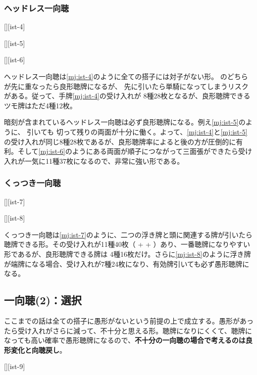 \documentclass[10pt, twocolumn]{article}
\begin{document}
\subsubsection*{ヘッドレス一向聴} 

[][ist-4]

[][ist-5]

[][ist-6]

ヘッドレス一向聴は\ref{mj:ist-4}のように全ての搭子には対子がない形。 のどちらが先に重なったら良形聴牌になるが、 先に引いたら単騎になってしまうリスクがある。従って、手牌\ref{mj:ist-4}の受け入れが  8種28枚となるが、良形聴牌できるツモ牌はただ4種12枚。

暗刻が含まれているヘッドレス一向聴は必ず良形聴牌になる。例え\ref{mj:ist-5}のように、 引いても  切って残りの両面が十分に働く。よって、\ref{mj:ist-4}と\ref{mj:ist-5}の受け入れが同じ8種28枚であるが、良形聴牌率によると後の方が圧倒的に有利。そして\ref{mj:ist-6}のようにある両面が順子につながって三面張ができたら受け入れが一気に11種37枚になるので、非常に強い形である。

\subsubsection*{くっつき一向聴}

[][ist-7]

[][ist-8]

くっつき一向聴は\ref{mj:ist-7}のように、二つの浮き牌と頭に関連する牌が引いたら聴牌できる形。その受け入れが11種40枚（ +  + ）あり、一番聴牌になりやすい形であるが、良形聴牌できる牌は  4種16枚だけ。さらに\ref{mj:ist-8}のように浮き牌が端牌になる場合、受け入れが7種24枚になり、有効牌引いても必ず愚形聴牌になる。

\subsection{一向聴(2)：選択}

ここまでの話は全ての搭子に愚形がないという前提の上で成立する。愚形があったら受け入れがさらに減って、不十分と思える形。聴牌になりにくくて、聴牌になっても高い確率で愚形聴牌になるので、\textbf{不十分の一向聴の場合で考えるのは良形変化と向聴戻し}\citep{manboo-iishanten}。

[][ist-9]
\end{document}
